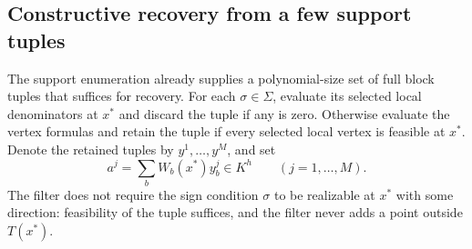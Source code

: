 \subsection{Constructive recovery from a few support tuples}\label{app:core-recovery}

The support enumeration already supplies a polynomial-size set of
full block tuples that suffices for recovery. For each $\sigma\in\Sigma$,
evaluate its selected local denominators at $x^*$ and discard the tuple
if any is zero. Otherwise evaluate the vertex formulas and retain the
tuple if every selected local vertex is feasible at $x^*$. Denote the
retained tuples by $y^1,\ldots,y^M$, and set
\[
              a^j=\sum_b W_b(x^*)y_b^j\in K^h\qquad(j=1,\ldots,M).
\]
The filter does not require the sign condition $\sigma$ to be realizable
at $x^*$ with some direction: feasibility of the tuple suffices, and the filter
never adds a point outside $T(x^*)$.

